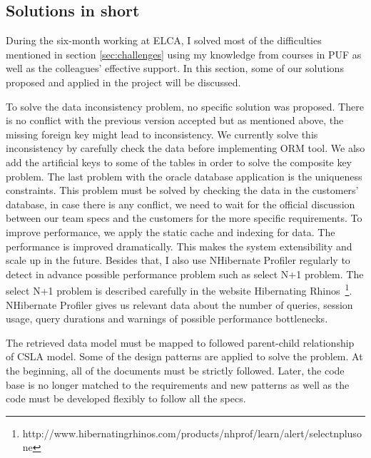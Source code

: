 \subsection{Solutions in short}
During the six-month working at ELCA, I solved most of the difficulties mentioned in section \ref{sec:challenges} using my knowledge from courses in PUF as well as the colleagues' effective support.  In this section, some of our solutions proposed and applied in the project will be discussed. 
\par
To solve the data inconsistency problem, no specific solution was proposed.  There is no conflict with the previous version accepted but as mentioned above, the missing foreign key might lead to inconsistency. We currently solve this inconsistency by carefully check the data before implementing ORM tool. We also add the artificial keys to some of the tables in order to solve the composite key problem.  The last problem with the oracle database application is the uniqueness constraints. This problem must be solved by checking the data in the customers' database, in case there is any conflict, we need to wait for the official discussion between our team specs and the customers for the more specific requirements.
To improve performance, we apply the static cache and indexing for data. The performance is improved dramatically. This makes the system extensibility and scale up in the future. Besides that, I also use NHibernate Profiler regularly to detect in advance possible performance problem such as select N+1 problem. The select N+1 problem is described carefully in the website Hibernating Rhinos~\footnote{http://www.hibernatingrhinos.com/products/nhprof/learn/alert/selectnplusone}. NHibernate Profiler gives us relevant data about the number of queries, session usage, query durations and warnings of possible performance bottlenecks.
\par
The retrieved data model must be mapped to followed parent-child relationship of CSLA model. Some of the design patterns are applied to solve the problem. At the beginning, all of the documents must be strictly followed. Later, the code base is no longer matched to the requirements and new patterns as well as the code must be developed flexibly to follow all the specs.
%

